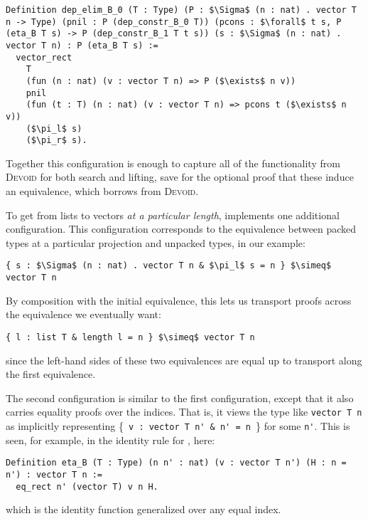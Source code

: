 \begin{lstlisting}
Definition dep_elim_B_0 (T : Type) (P : $\Sigma$ (n : nat) . vector T n -> Type) (pnil : P (dep_constr_B_0 T)) (pcons : $\forall$ t s, P (eta_B T s) -> P (dep_constr_B_1 T t s)) (s : $\Sigma$ (n : nat) . vector T n) : P (eta_B T s) :=
  vector_rect
    T
    (fun (n : nat) (v : vector T n) => P ($\exists$ n v))
    pnil
    (fun (t : T) (n : nat) (v : vector T n) => pcons t ($\exists$ n v))
    ($\pi_l$ s)
    ($\pi_r$ s).
\end{lstlisting}
Together this configuration is enough to capture all of the functionality from \textsc{Devoid} for both search and lifting,
save for the optional proof that these induce an equivalence, which \toolname borrows from \textsc{Devoid}.

To get from lists to vectors \textit{at a particular length}, \toolname implements one additional configuration.
This configuration corresponds to the equivalence between packed types at a particular projection
and unpacked types, in our example:

\begin{lstlisting}
{ s : $\Sigma$ (n : nat) . vector T n & $\pi_l$ s = n } $\simeq$ vector T n
\end{lstlisting}
By composition with the initial equivalence, this lets us transport proofs
across the equivalence we eventually want:

\begin{lstlisting}
{ l : list T & length l = n } $\simeq$ vector T n
\end{lstlisting}
since the left-hand sides of these two equivalences are equal up to transport along the first equivalence.

The second configuration is similar to the first configuration, except that it also carries equality proofs over the indices.
That is, it views the type \B like \lstinline{vector T n} as implicitly representing \{\lstinline{ v : vector T n' & n' = n }\} for some \lstinline{n'}.
This is seen, for example, in the identity rule for \B, here: 

\begin{lstlisting}
Definition eta_B (T : Type) (n n' : nat) (v : vector T n') (H : n = n') : vector T n :=
  eq_rect n' (vector T) v n H.
\end{lstlisting}
which is the identity function generalized over any equal index.

